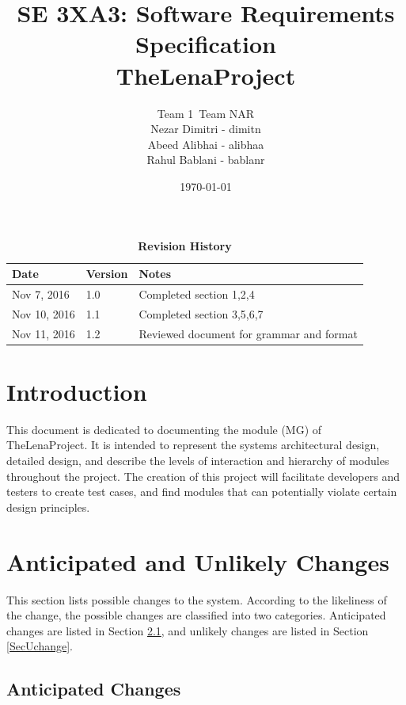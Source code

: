 \documentclass[12pt, titlepage]{article}
\title{SE 3XA3: Software Requirements Specification\\TheLenaProject}
\author{Team 1\, Team NAR
		 \\ Nezar Dimitri - dimitn
		 \\ Abeed Alibhai - alibhaa
		 \\ Rahul Bablani - bablanr
}
\date{\today}
\begin{document}
\maketitle
{}
\tableofcontents
\listoftables
\listoffigures

\begin{table}[htbp]
\caption{\bf Revision History}
\begin{tabularx}{\textwidth}{p{3cm}p{2cm}X}
\toprule {\bf Date} & {\bf Version} & {\bf Notes}\\
\midrule
Nov 7, 2016 & 1.0 & Completed section 1,2,4 \\
Nov 10, 2016 & 1.1 & Completed section 3,5,6,7 \\
Nov 11, 2016 & 1.2 & Reviewed document for grammar and format\\
\bottomrule
\end{tabularx}
\end{table}

\clearpage




\section{Introduction}

This document is dedicated to documenting the module (MG) of
TheLenaProject. It is intended to represent the systems architectural design, detailed design, and describe the levels of interaction and hierarchy of modules throughout the project. The creation of this project will facilitate developers and testers to create test cases, and find modules that can potentially violate certain design principles.

\section{Anticipated and Unlikely Changes} \label{SecChange}

This section lists possible changes to the system. According to the likeliness
of the change, the possible changes are classified into two
categories. Anticipated changes are listed in Section \ref{SecAchange}, and
unlikely changes are listed in Section \ref{SecUchange}.

\subsection{Anticipated Changes} \label{SecAchange}
\end{document}
